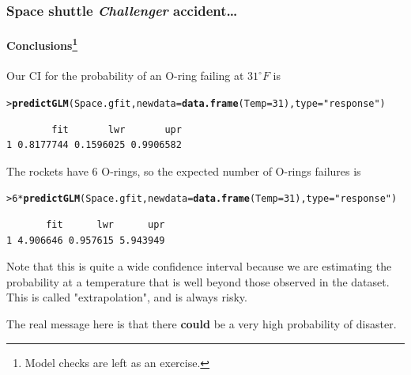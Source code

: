 \documentclass{beamer}\usepackage[]{graphicx}\usepackage[]{xcolor}
\makeatletter
\newcommand{\hlnum}[1]{\textcolor[rgb]{0.686,0.059,0.569}{#1}}%
\newcommand{\hlstr}[1]{\textcolor[rgb]{0.192,0.494,0.8}{#1}}%
\newcommand{\hlopt}[1]{\textcolor[rgb]{0,0,0}{#1}}%
\newcommand{\hlstd}[1]{\textcolor[rgb]{0.345,0.345,0.345}{#1}}%
\newcommand{\hlkwc}[1]{\textcolor[rgb]{0.333,0.667,0.333}{#1}}%
\newcommand{\hlkwd}[1]{\textcolor[rgb]{0.737,0.353,0.396}{\textbf{#1}}}%
\newenvironment{kframe}{%
 \def\at@end@of@kframe{}%
 \ifinner\ifhmode%
  \def\at@end@of@kframe{\end{minipage}}%
  \begin{minipage}{\columnwidth}%
 \fi\fi%
 \def\FrameCommand##1{\hskip\@totalleftmargin \hskip-\fboxsep
 \colorbox{shadecolor}{##1}\hskip-\fboxsep
     \hskip-\linewidth \hskip-\@totalleftmargin \hskip\columnwidth}%
 \MakeFramed {\advance\hsize-\width
   \@totalleftmargin\z@ \linewidth\hsize
   \@setminipage}}%
 {\par\unskip\endMakeFramed%
 \at@end@of@kframe}
\newenvironment{knitrout}{}{} %
\makeatother
\begin{document}
\begin{frame}[fragile]
\frametitle{Space shuttle {\em Challenger} accident\ldots}
\framesubtitle{Conclusions\footnote{Model checks are left as an exercise.}}
Our CI for the probability of an O-ring failing at $31^{\circ} F$ is

\begin{knitrout}\scriptsize
{}\color{fgcolor}\begin{kframe}
\begin{alltt}
\hlstd{> }\hlkwd{predictGLM}\hlstd{(Space.gfit,} \hlkwc{newdata} \hlstd{=} \hlkwd{data.frame}\hlstd{(}\hlkwc{Temp}\hlstd{=}\hlnum{31}\hlstd{),} \hlkwc{type} \hlstd{=} \hlstr{"response"}\hlstd{)}
\end{alltt}


{\ttfamily\noindent\itshape\color{messagecolor}{***Estimates and CIs are on the response scale***}}\begin{verbatim}
        fit       lwr       upr
1 0.8177744 0.1596025 0.9906582
\end{verbatim}
\end{kframe}
\end{knitrout}
\medskip

The rockets have 6 O-rings, so the expected number of O-rings failures is
\begin{knitrout}\scriptsize
{}\color{fgcolor}\begin{kframe}
\begin{alltt}
\hlstd{> }\hlnum{6}\hlopt{*}\hlkwd{predictGLM}\hlstd{(Space.gfit,} \hlkwc{newdata} \hlstd{=} \hlkwd{data.frame}\hlstd{(}\hlkwc{Temp}\hlstd{=}\hlnum{31}\hlstd{),} \hlkwc{type} \hlstd{=} \hlstr{"response"}\hlstd{)}
\end{alltt}


{\ttfamily\noindent\itshape\color{messagecolor}{***Estimates and CIs are on the response scale***}}\begin{verbatim}
       fit      lwr      upr
1 4.906646 0.957615 5.943949
\end{verbatim}
\end{kframe}
\end{knitrout}

Note that this is quite a wide confidence interval because we are estimating
the probability at a temperature that is well beyond those observed
in the dataset. This is called "extrapolation", and is always risky.

\medskip

The real message here is that there {\bf could} be a very high probability of 
disaster.

\end{frame}
\end{document}
